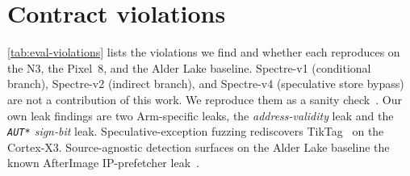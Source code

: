 \section{Contract violations}
\label{sec:eval-violations}

\autoref{tab:eval-violations} lists the violations we find and whether each reproduces on the N3,
the Pixel~8, and the Alder Lake baseline. Spectre-v1 (conditional branch), Spectre-v2 (indirect
branch), and Spectre-v4 (speculative store bypass) are not a contribution of this work. We reproduce
them as a sanity check~\cite{revizor}. Our own leak findings are two Arm-specific leaks, the
\emph{address-validity} leak and the \emph{\texttt{AUT*} sign-bit} leak. Speculative-exception
fuzzing rediscovers TikTag~\cite{tiktag} on the Cortex-X3. Source-agnostic detection surfaces on the
Alder Lake baseline the known AfterImage IP-prefetcher leak~\cite{afterimage}.

